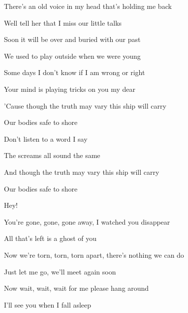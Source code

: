 \begin{song}
 \par
There's an old voice in my head that's  holding me back \par
Well tell her that I miss our little talks \par
{}Soon it will be over and buried with our past \par
We used to play outside when we were young \par
{} \par

\bigskip

Some days I don't know if I am wrong or right \par
Your mind is playing tricks on you my dear \par
'Cause though the truth may vary this  ship will carry \par
{} \par
Our bodies safe to shore  \par

\bigskip

\begin{chorusbox}{\Chorus}
Don’t listen to a word I say  \par
The screams all sound the same  \par
And though the truth may vary this  ship will carry \par
Our bodies safe to shore \par
\end{chorusbox}

\bigskip

   Hey!  \par

\bigskip

You're gone, gone, gone away, I watched you disappear \par
All that's left is a ghost of you \par
Now we're torn, torn, torn apart, there's nothing we can do \par
Just let me go, we'll meet again soon \par
{} \par
Now wait, wait, wait for me  please hang around \par
{} \par
I’ll see you when I fall asleep  \par


\end{song}
